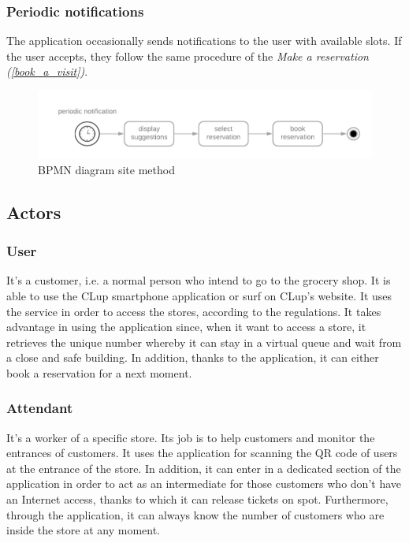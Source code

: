\documentclass[table, 12pt]{article}
\begin{document}
\begin{flushleft}
    \subsubsection{Periodic notifications}
    The application occasionally sends notifications to the user with available slots. If the user accepts, they follow the same procedure of the \textit{Make a reservation (\ref{book_a_visit})}.
    \begin{figure}[H]
        \begin{center}
            \includegraphics[scale=0.35]{assets/periodic-notifications.png}
            \caption{BPMN diagram site method}
        \end{center}
    \end{figure}
    \subsection{Actors}
    \subsubsection{User}
    It's a customer, i.e. a normal person who intend to go to the grocery shop. It is able to use the CLup smartphone application or surf on CLup's website. It uses the service in order to access the stores, according to the regulations. It takes advantage in using the application since, when it want to access a store, it retrieves the unique number whereby it can stay in a virtual queue and wait from a close and safe building. In addition, thanks to the application, it can either book a reservation for a next moment.

    \subsubsection{Attendant}
    It's a worker of a specific store. Its job is to help customers and monitor the entrances of customers. It uses the application for scanning the QR code of users at the entrance of the store. In addition, it can enter in a dedicated section of the application in order to act as an intermediate for those customers who don't have an Internet access, thanks to which it can release tickets on spot. Furthermore, through the application, it can always know the number of customers who are inside the store at any moment.


\end{flushleft}
\end{document}
